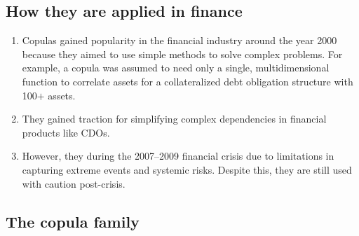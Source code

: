 \subsection{How they are applied in finance}
\begin{enumerate}[label=\textbf{\alph*)}]
\item Copulas gained popularity in the financial industry around the year 2000 because they
      aimed to use simple methods to solve complex problems. For example, a copula was assumed
      to need only a single, multidimensional function to correlate assets for a collateralized
      debt obligation structure with 100$+$ assets.
\item They gained traction for simplifying complex dependencies in financial products like CDOs.
\item However, they  during the 2007--2009 financial crisis due to
      limitations in capturing extreme events and systemic risks. Despite this, they are still
      used with caution post-crisis.
\end{enumerate}

\subsection{The copula family}

